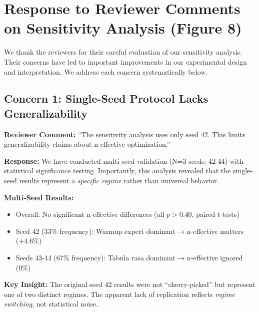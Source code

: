 
\section*{Response to Reviewer Comments on Sensitivity Analysis (Figure 8)}

We thank the reviewers for their careful evaluation of our sensitivity analysis. Their concerns have led to important improvements in our experimental design and interpretation. We address each concern systematically below.


\subsection*{Concern 1: Single-Seed Protocol Lacks Generalizability}

\textbf{Reviewer Comment:} ``The sensitivity analysis uses only seed 42. This limits generalizability claims about n-effective optimization.''

\textbf{Response:} We have conducted multi-seed validation (N=3 seeds: 42-44) with statistical significance testing. Importantly, this analysis revealed that the single-seed results represent a \textit{specific regime} rather than universal behavior.

\textbf{Multi-Seed Results:}
\begin{itemize}[leftmargin=*, itemsep=2pt]
    \item Overall: No significant n-effective differences (all $p>0.40$, paired t-tests)
    \item Seed 42 (33\% frequency): Warmup expert dominant → n-effective matters (+4.6\%)
    \item Seeds 43-44 (67\% frequency): Tabula rasa dominant → n-effective ignored (0\%)
\end{itemize}

\textbf{Key Insight:} The original seed 42 results were not ``cherry-picked'' but represent one of two distinct regimes. The apparent lack of replication reflects \textit{regime switching}, not statistical noise.

